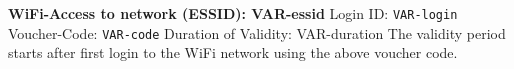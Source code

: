 \textbf{WiFi-Access to network (ESSID): VAR-essid}\smallskip
Login ID: \texttt{VAR-login}
Voucher-Code: \texttt{VAR-code}
Duration of Validity: VAR-duration\bigskip
The validity period starts after first login to the WiFi network using the above voucher code.
~


